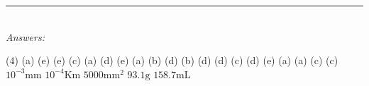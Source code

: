 \documentclass[main.tex]{subfiles}
\begin{document}
\begin{fullwidth}
\par\noindent\rule{0.5\textwidth}{0.4pt}\\
\emph{Answers:}\\
\vspace{0.5cm}
\begin{tasks}[counter-format={tsk[1].}, label-align=left, label-offset={0mm}, label-width={5mm}, item-indent={1mm}, label-format={\bfseries}](4)
\task (a) 
\task (e) 
\task (e) 
\task (c) 
\task (a)
\task (d)
\task (e)
\task (a)
\task (b)
\task (d)
\task (b)
\task (d)
\task (d)
\task (c)
\task (d)
\task (e)
\task (a)
\task (a)
\task (c)
\task (c)
\task {}
\task $10^{-3}\text{mm}$
\task $10^{-4}\text{Km}$
\task \small $5000\text{mm}^2$
\task $93.1\text{g}$
\task \small $158.7\text{mL}$
\end{tasks}






\end{fullwidth}
\restoregeometry
\end{document}
